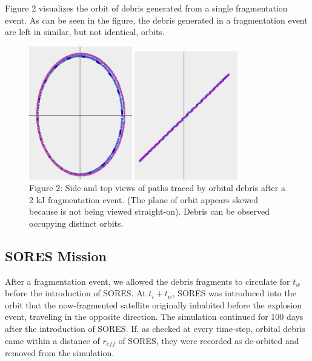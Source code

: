 \documentclass[12pt]{scrartcl}
\begin{document}
Figure 2 visualizes the orbit of debris generated from a single fragmentation event. As can be seen in the figure, the debris generated in a fragmentation event are left in similar, but not identical, orbits.
\begin{figure}
\begin{center}
\label{fig:sat_orbit_explosion}
\includegraphics[width=0.4\textwidth]{depth.jpg}
\includegraphics[width=0.4\textwidth]{top.jpg}\\
Figure 2: Side and top views of paths traced by orbital debris after a 2 kJ fragmentation event. (The plane of orbit appears skewed because is not being viewed straight-on). Debris can be observed occupying distinct orbits. 
\end{center}
\end{figure}

\subsection{SORES Mission}

After a fragmentation event, we allowed the debris fragments to circulate for $t_{w}$ before the introduction of SORES. At $t_{i} + t_{w}$, SORES was introduced into the orbit that the now-fragmented satellite originally inhabited before the explosion event, traveling in the opposite direction. The simulation continued for 100 days after the introduction of SORES. If, as checked at every time-step, orbital debris came within a distance of $r_{\mathit{eff}}$ of SORES, they were recorded as de-orbited and removed from the simulation. 
\end{document}
